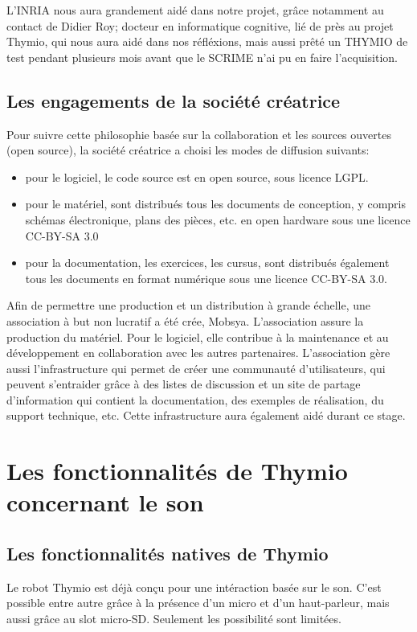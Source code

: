 \documentclass[a4paper, 12pt]{report}
\begin{document}
L'INRIA nous aura grandement aidé dans notre projet, grâce notamment au contact de Didier Roy; docteur en informatique cognitive, lié de près au projet Thymio, qui nous aura aidé dans nos réfléxions, mais aussi prêté un THYMIO de test pendant plusieurs mois avant que le SCRIME n'ai pu en faire l'acquisition.

\section{Les engagements de la société créatrice}
Pour suivre cette philosophie basée sur la collaboration et les sources ouvertes (open source), la société créatrice a choisi les modes de diffusion suivants:
\begin{itemize}
\item pour le logiciel, le code source est en open source, sous licence LGPL.
\item pour le matériel, sont distribués tous les documents de conception, y compris schémas électronique, plans des pièces, etc. en open hardware sous une licence CC-BY-SA 3.0
\item pour la documentation, les exercices, les cursus, sont distribués également tous les documents en format numérique sous une licence CC-BY-SA 3.0.
\end{itemize}

Afin de permettre une production et un distribution à grande échelle, une association à but non lucratif a été crée, Mobsya. L'association assure la production du matériel. Pour le logiciel, elle contribue à la maintenance et au développement en collaboration avec les autres partenaires. L'association gère aussi l'infrastructure qui permet de créer une communauté d'utilisateurs, qui peuvent s'entraider grâce à des listes de discussion et un site de partage d'information qui contient la documentation, des exemples de réalisation, du support technique, etc. Cette infrastructure aura également aidé durant ce stage.

\chapter{Les fonctionnalités de Thymio concernant le son}
\section{Les fonctionnalités natives de Thymio}
Le robot Thymio est déjà conçu pour une intéraction basée sur le son. C'est possible entre autre grâce à la présence d'un micro et d'un haut-parleur, mais aussi grâce au slot micro-SD. Seulement les possibilité sont limitées.
\end{document}
